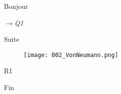 \documentclass[12pt]{article}
\newenvironment{MaReponse}{\begin{tb}}{\end{tb}}
\newcommand{\MaQuest}[1]{\par\vspace{0.3\baselineskip}\noindent$\rightarrow$\textit{#1}\par\vspace{0.3\baselineskip}}
\begin{document}
	
	Bonjour
	\MaQuest{Q1}
	Suite
	\begin{MaReponse}
		\begin{figure}[H]
			\centering
			\texttt{[image: 002\_VonNeumann.png]}
		\end{figure}
		R1
	\end{MaReponse}
	Fin
\end{document}
